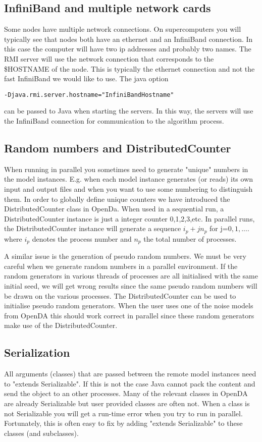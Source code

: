 \documentclass[12pt]{article}
\begin{document}
\subsection{InfiniBand and multiple network cards}
Some nodes have multiple network connections. On supercomputers you will typically see that nodes both have an ethernet and an InfiniBand connection. In this case the computer will have two ip addresses and probably two names. The RMI server will use the network connection that corresponds to the \$HOSTNAME of the node. This is typically the ethernet connection and not the fast InfiniBand we would like to use. The java option 
\begin{verbatim}
-Djava.rmi.server.hostname="InfiniBandHostname"
\end{verbatim}  
can be passed to Java when starting the servers. In this way, the servers will use the InfiniBand connection for communication to the algorithm process. 


\subsection{Random numbers and DistributedCounter}
When running in parallel you sometimes need to generate "unique" numbers in the model instances. E.g. when each model instance generates (or reads) its own input and output files and when you want to use some numbering to distinguish them.
In order to globally define unique counters we have introduced the DistributedCounter class in OpenDa. When used in a sequential run, a DistributedCounter instance is just a integer counter 0,1,2,3,etc. In parallel runs, the DistributedCounter instance will generate a sequence $i_p+j n_p$ for j=$0,1,....$ where $i_p$ denotes the process number and $n_p$ the total number of processes.

A similar issue is the generation of pseudo random numbers. We must be very careful when we generate random numbers in a parallel environment. If the random generators in various threads of processes are all initialised with the same initial seed, we will get wrong results since the same pseudo random numbers will be drawn on the various processes. The DistributedCounter can be used to initialise pseudo random generators. When the user uses one of the noise models from OpenDA this should work correct in parallel since these random generators make use of the DistributedCounter.


\subsection{Serialization}
All arguments (classes) that are passed between the remote model instances need to "extends Serializable". If this is not the case Java cannot pack the content and send the object to an other processes. Many of the relevant classes in OpenDA are already Serializable but user provided classes are often not. When a class is not Serializable you will get a run-time error when you try to run in parallel. Fortunately, this is often easy to fix by adding "extends Serializable" to these classes (and subclasses). 
\end{document}
